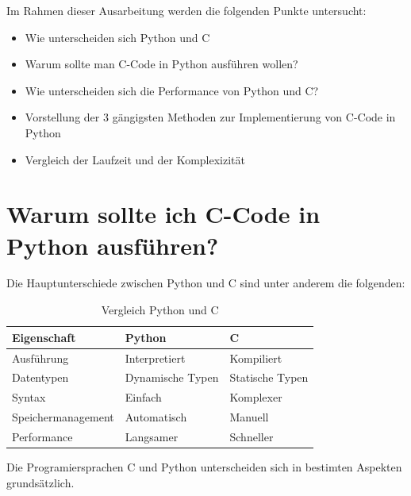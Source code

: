 \documentclass[a4paper, parskip=half]{scrartcl}
\begin{document}
Im Rahmen dieser Ausarbeitung werden die folgenden Punkte untersucht: 

\begin{itemize}
    \item Wie unterscheiden sich Python und C
    \item Warum sollte man C-Code in Python ausführen wollen?
    \item Wie unterscheiden sich die Performance von Python und C?
    \item Vorstellung der 3 gängigsten Methoden zur Implementierung von C-Code in Python
    \item Vergleich der Laufzeit und der Komplexizität
  \end{itemize}      

\section{Warum sollte ich C-Code in Python ausführen?}

Die Hauptunterschiede zwischen Python und C sind unter anderem die folgenden:


\begin{table}[H]
    \centering
    \begin{tabular}{|l||l|l|}\hline
        Eigenschaft & Python & C  \\\hline
        Ausführung & Interpretiert & Kompiliert \\
        Datentypen & Dynamische Typen & Statische Typen \\
        Syntax & Einfach & Komplexer \\
        Speichermanagement & Automatisch & Manuell \\
        Performance & Langsamer & Schneller \\ \hline 
    \end{tabular}
    \caption{Vergleich Python und C}
    \label{tab:comparison python and c}
\end{table}

Die Programiersprachen C und Python unterscheiden sich in bestimten Aspekten grundsätzlich. 
\end{document}
